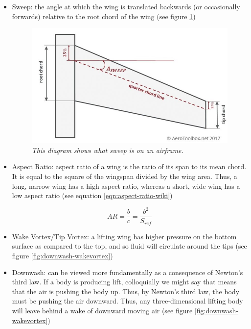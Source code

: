 \documentclass{journal}
\begin{document}
	\begin{itemize}
		\item Sweep: the angle at which the wing is translated backwards (or occasionally forwards) relative to the root chord of the wing (see figure \ref{fig:sweep})
		
		\begin{figure}[H]
			\centering
			\includegraphics[scale=0.4]{../graphics/sweep.jpg}
			\caption{\emph{This diagram shows what sweep is on an airframe.}}
			\label{fig:sweep}
		\end{figure}
		
		\item Aspect Ratio: aspect ratio of a wing is the ratio of its span to its mean chord. It is equal to the square of the wingspan divided by the wing area. Thus, a long, narrow wing has a high aspect ratio, whereas a short, wide wing has a low aspect ratio (see equation \ref{eqn:aspect-ratio-wiki})
		
		\begin{equation}
			AR = \frac{b}{c} = \frac{b^2}{S_{ref}}
			\label{eqn:aspect-ratio-wiki}
		\end{equation}
	
		\item Wake Vortex/Tip Vortex: a lifting wing has higher pressure on the bottom surface as compared to the top, and so fluid will circulate around the tips (see figure \ref{fig:downwash-wakevortex})
		\item Downwash: can be viewed more fundamentally as a consequence of Newton’s third law. If a body is producing lift, colloquially we might say that means that the air is pushing the body up. Thus, by Newton’s third law, the body must be pushing the air downward. Thus, any three-dimensional lifting body will leave behind a wake of downward moving air (see figure \ref{fig:downwash-wakevortex})
		

\end{itemize}
\end{document}
